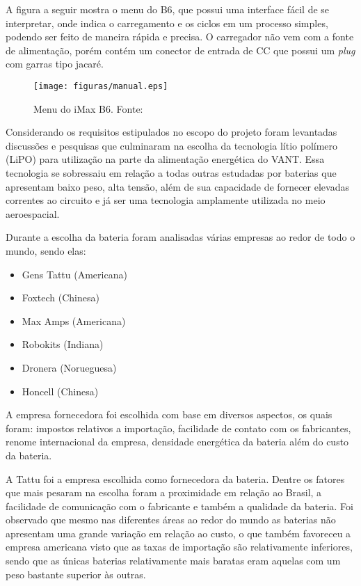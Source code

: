 A figura a seguir mostra o menu do B6, que possui uma interface fácil de se interpretar, onde indica o carregamento e os ciclos em um processo simples, podendo ser feito de maneira rápida e precisa. O carregador não vem com a fonte de alimentação, porém contém um conector de entrada de CC que possui um \textit{plug} com garras tipo jacaré.

 \begin{figure}[h!]
    \centering
	\texttt{[image: figuras/manual.eps]}
    \caption{Menu do iMax B6. Fonte: \cite{ibmax}}
\end{figure}



Considerando os requisitos estipulados  no escopo do projeto foram levantadas discussões e pesquisas que culminaram na escolha da tecnologia lítio polímero (LiPO) para utilização na parte da alimentação energética do VANT. Essa tecnologia se sobressaiu em relação a todas outras estudadas por baterias que apresentam baixo peso, alta tensão, além de sua capacidade de fornecer elevadas correntes ao circuito e já ser uma tecnologia amplamente utilizada no meio aeroespacial.

Durante a escolha da bateria foram analisadas várias empresas ao redor de todo o mundo, sendo elas:

\begin{itemize}
 
\item Gens Tattu (Americana)

\item Foxtech (Chinesa)

\item Max Amps (Americana)

\item Robokits (Indiana)

\item Dronera (Norueguesa)

\item Honcell (Chinesa)

\end{itemize}


A empresa fornecedora foi escolhida com base em diversos aspectos, os quais foram: impostos relativos a importação, facilidade de contato com os fabricantes, renome internacional da empresa, densidade energética da bateria além do custo da bateria.

A  Tattu foi a empresa escolhida como fornecedora da bateria.  Dentre os fatores que mais pesaram na escolha foram a proximidade em relação ao Brasil, a facilidade de comunicação com o fabricante e também a qualidade da bateria. Foi observado que mesmo nas diferentes áreas ao redor do mundo as baterias não apresentam uma grande variação em relação ao custo, o que também favoreceu a empresa americana visto que as taxas de importação são relativamente inferiores, sendo que as únicas baterias relativamente mais baratas eram aquelas com um peso bastante superior às outras.

